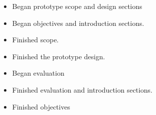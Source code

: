 \begin{itemize}

\item Began prototype scope and design sections

\item Began objectives and introduction sections.

\item Finished scope.

\item Finished the prototype design.

\item Began evaluation

\item Finished evaluation and introduction sections.

\item Finished objectives

\end{itemize}
